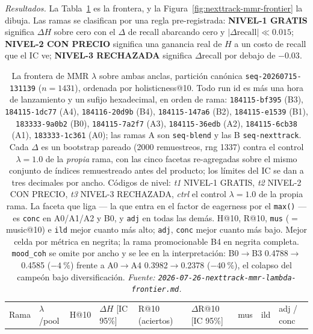 \documentclass[11pt]{article}
\newcommand{\runid}[1]{\texttt{\small\seqsplit{#1}}}
\newcommand{\dsid}[1]{\texttt{\small #1}}
\begin{document}
\emph{Resultados.} La Tabla~\ref{tab:nexttrack-mmr-arms} es la frontera, y la
Figura~\ref{fig:nexttrack-mmr-frontier} la dibuja. Las ramas se clasifican por una
regla pre-registrada: \textbf{NIVEL-1 GRATIS} significa $\Delta H$ sobre cero con
el $\Delta$ de recall abarcando cero y $|\Delta\text{recall}| \ll \num{0.015}$;
\textbf{NIVEL-2 CON PRECIO} significa una ganancia real de $H$ a un costo de recall
que el IC ve; \textbf{NIVEL-3 RECHAZADA} significa $\Delta$recall por debajo de
$-\num{0.03}$.

\begin{table}[ht]
  \centering
  \caption{La frontera de MMR $\lambda$ sobre ambas anclas, partición canónica
  \dsid{seq-20260715-131139} ($n=\num{1431}$), ordenada por holisticness@10. Todo
  run id es \protect\runid{run-20260726-} más una hora de lanzamiento y un sufijo
  hexadecimal, en orden de rama: \texttt{184115-bf395} (B3),
  \texttt{184115-1dc77} (A4), \texttt{184116-20d9b} (B4),
  \texttt{184115-147a6} (B2), \texttt{184115-e1539} (B1),
  \texttt{183333-9a0b2} (B0), \texttt{184115-7a2f7} (A3),
  \texttt{184115-36edb} (A2), \texttt{184115-6cb38} (A1),
  \texttt{183333-1c361} (A0); las ramas A son \texttt{seq-blend} y las B
  \texttt{seq-nexttrack}. Cada $\Delta$ es un bootstrap pareado (\num{2000}
  remuestreos, rng \num{1337}) contra el control $\lambda=\num{1.0}$ de la
  \emph{propia} rama, con las cinco facetas re-agregadas sobre el mismo conjunto
  de índices remuestreado antes del producto; los límites del IC se dan a tres
  decimales por ancho. Códigos de nivel: \emph{t1} NIVEL-1 GRATIS, \emph{t2}
  NIVEL-2 CON PRECIO, \emph{t3} NIVEL-3 RECHAZADA, \emph{ctrl} el control
  $\lambda=\num{1.0}$ de la propia rama. La faceta que liga --- la que entra en el
  factor de eagerness por el \texttt{max()} --- es \texttt{conc} en A0/A1/A2 y B0, y
  \texttt{adj} en todas las demás. H@10, R@10, \texttt{mus} ($=$ music@10) e
  \texttt{ild} mejor cuanto más alto; \texttt{adj}, \texttt{conc} mejor cuanto más
  bajo. Mejor celda por métrica en negrita; la rama promocionable B4 en negrita
  completa. \texttt{mood\_coh} se omite por ancho y se lee en la interpretación:
  B0$\to$B3 \num{0.4788}$\to$\num{0.4585} ($-\SI{4}{\percent}$) frente a
  A0$\to$A4 \num{0.3982}$\to$\num{0.2378} ($-\SI{40}{\percent}$), el colapso del
  campeón bajo diversificación.
  \emph{Fuente: \texttt{2026-07-26-nexttrack-mmr-lambda-frontier.md}.}}
  \label{tab:nexttrack-mmr-arms}
  {\scriptsize\setlength{\tabcolsep}{1.9pt}\begin{tabular}{lllllllll}
    \toprule
    Rama & $\lambda$/pool & H@10 & $\Delta H$ [IC 95\%] & R@10 (aciertos) & $\Delta$R@10 [IC 95\%] & mus & ild & adj / conc \\

\end{tabular}}
\end{table}
\end{document}
